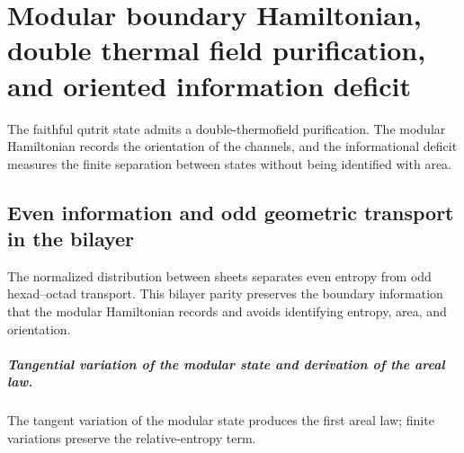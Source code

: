 \chapter{Modular boundary Hamiltonian, double thermal field purification, and oriented information deficit}
\label{chap:parte-iv-60}

The faithful qutrit state admits a double-thermofield purification. The modular Hamiltonian records the orientation of the channels, and the informational deficit measures the finite separation between states without being identified with area.



\section{Even information and odd geometric transport in the bilayer}

The normalized distribution between sheets separates even entropy from odd
hexad--octad transport. This bilayer parity preserves the boundary information that
the modular Hamiltonian records and avoids identifying entropy, area, and
orientation.

\begingroup
\let\chapter\section
\let\section\subsection
\let\subsection\subsubsection
\let\subsubsection\paragraph
\let\clearpage\relax
\let\cleardoublepage\relax

\endgroup

\paragraph{Tangential variation of the modular state and derivation of the areal law.} The tangent variation of the modular state produces the first areal law; finite variations preserve the relative-entropy term.
